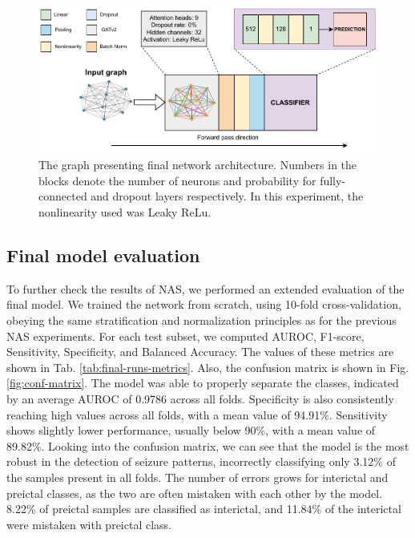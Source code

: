 \documentclass[a4paper,fleqn]{cas-sc}
\begin{document}
\begin{figure}[h]
    \centering
    \includegraphics[scale=0.85]{figures/network_final_elsvier.pdf}
    \caption{The graph presenting final network architecture. Numbers in the blocks denote the number of neurons and probability for fully-connected and dropout layers respectively. In this experiment, the nonlinearity used was Leaky ReLu.
    }
    \label{fig:final-network}
\end{figure}



\subsection{Final model evaluation}
To further check the results of NAS, we performed an extended evaluation of the final model. We trained the network from scratch, using 10-fold cross-validation, obeying the same stratification and normalization principles as for the previous NAS experiments. For each test subset, we computed AUROC, F1-score, Sensitivity, Specificity, and Balanced Accuracy. The values of these metrics are shown in Tab. \ref{tab:final-runs-metrics}. Also, the confusion matrix is shown in Fig.\ref{fig:conf-matrix}. The model was able to properly separate the classes, indicated by an average AUROC of 0.9786 across all folds. Specificity is also consistently reaching high values across all folds, with a mean value of 94.91\%. Sensitivity shows slightly lower performance, usually below 90\%, with a mean value of 89.82\%. Looking into the confusion matrix, we can see that the model is the most robust in the detection of seizure patterns, incorrectly classifying only 3.12\% of the samples present in all folds. The number of errors grows for interictal and preictal classes, as the two are often mistaken with each other by the model. 8.22\% of preictal samples are classified as interictal, and 11.84\% of the interictal were mistaken with preictal class.
\end{document}
